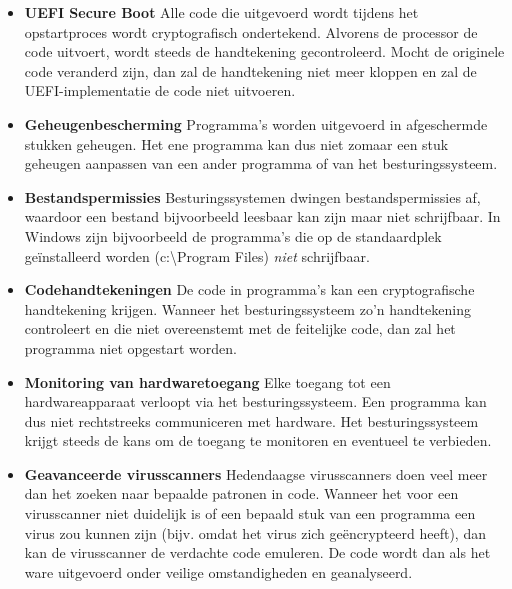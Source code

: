 \begin{itemize}
\item{\textbf{UEFI Secure Boot}} Alle code die uitgevoerd wordt tijdens het opstartproces wordt cryptografisch ondertekend. Alvorens de processor de code uitvoert, wordt steeds de handtekening gecontroleerd. Mocht de originele code veranderd zijn, dan zal de handtekening niet meer kloppen en zal de UEFI-implementatie de code niet uitvoeren.
\item{\textbf{Geheugenbescherming}} Programma's worden uitgevoerd in afgeschermde stukken geheugen. Het ene programma kan dus niet zomaar een stuk geheugen aanpassen van een ander programma of van het besturingssysteem.
\item{\textbf{Bestandspermissies}} Besturingssystemen dwingen bestandspermissies af, waardoor een bestand bijvoorbeeld leesbaar kan zijn maar niet schrijfbaar. In Windows zijn bijvoorbeeld de programma's die op de standaardplek ge\"installeerd worden (c:\textbackslash{}Program Files) \emph{niet} schrijfbaar.
\item{\textbf{Codehandtekeningen}} De code in programma's kan een cryptografische handtekening krijgen. Wanneer het besturingssysteem zo'n handtekening controleert en die niet overeenstemt met de feitelijke code, dan zal het programma niet opgestart worden.
\item{\textbf{Monitoring van hardwaretoegang}} Elke toegang tot een hardwareapparaat verloopt via het besturingssysteem. Een programma kan dus niet rechtstreeks communiceren met hardware. Het besturingssysteem krijgt steeds de kans om de toegang te monitoren en eventueel te verbieden.
\item{\textbf{Geavanceerde virusscanners}} Hedendaagse virusscanners doen veel meer dan het zoeken naar bepaalde patronen in code. Wanneer het voor een virusscanner niet duidelijk is of een bepaald stuk van een programma een virus zou kunnen zijn (bijv. omdat het virus zich ge\"encrypteerd heeft), dan kan de virusscanner de verdachte code emuleren. De code wordt dan als het ware uitgevoerd onder veilige omstandigheden en geanalyseerd.
\end{itemize} 